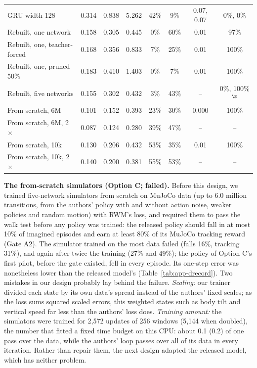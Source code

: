 \begin{table}[h]
{\begin{tabular}{@{}lccccccc@{}}
GRU width 128 & 0.314 & 0.838 & 5.262 & 42\% & 9\% & 0.07, 0.07 & 0\%, 0\% \\
Rebuilt, one network & 0.158 & 0.305 & 0.445 & 0\% & 60\% & 0.01 & 97\% \\
Rebuilt, one, teacher-forced & 0.168 & 0.356 & 0.833 & 7\% & 25\% & 0.01 & 100\% \\
Rebuilt, one, pruned 50\% & 0.183 & 0.410 & 1.403 & 0\% & 7\% & 0.01 & 100\% \\
Rebuilt, five networks & 0.155 & 0.302 & 0.432 & 3\% & 43\% & -- & 0\%, 100\%$^\S$ \\
From scratch, 6M & 0.101 & 0.152 & 0.393 & 23\% & 30\% & 0.000 & 100\% \\
From scratch, 6M, 2$\times$ & 0.087 & 0.124 & 0.280 & 39\% & 47\% & -- & -- \\
From scratch, 10k & 0.130 & 0.206 & 0.432 & 53\% & 35\% & 0.01 & 100\% \\
From scratch, 10k, 2$\times$ & 0.140 & 0.200 & 0.381 & 55\% & 53\% & -- & -- \\
\bottomrule
\end{tabular}}
\end{table}

\textbf{The from-scratch simulators (Option C; failed).} Before this design, we trained five-network simulators from
scratch on MuJoCo data (up to 6.0 million transitions, from the authors' policy with and without action
noise, weaker policies and random motion) with RWM's loss, and required them to pass the walk test before any
policy was trained: the released policy should fall in at most 10\% of imagined episodes and earn at least
80\% of its MuJoCo tracking reward (Gate A2). The simulator trained on the most data failed (falls 16\%,
tracking 31\%), and again after twice the training (27\% and 49\%); the policy of Option C's first pilot, before the gate existed, fell
in every episode. Its one-step error was nonetheless lower than the released model's (Table~\ref{tab:app-drecord}). Two
mistakes in our design probably lay behind the failure. \emph{Scaling:} our trainer divided each state by its own data's spread
instead of the authors' fixed scales; as the loss sums squared scaled errors, this weighted states such as body tilt and
vertical speed far less than the authors' loss does. \emph{Training amount:} the simulators were trained for
2{,}572 updates of 256 windows (5{,}144 when doubled), the number that fitted a fixed time budget
on this CPU: about 0.1 (0.2) of one pass over the data, while the authors' loop passes over all of its
data in every iteration. Rather than repair them, the next design adapted the released model, which has neither problem.

